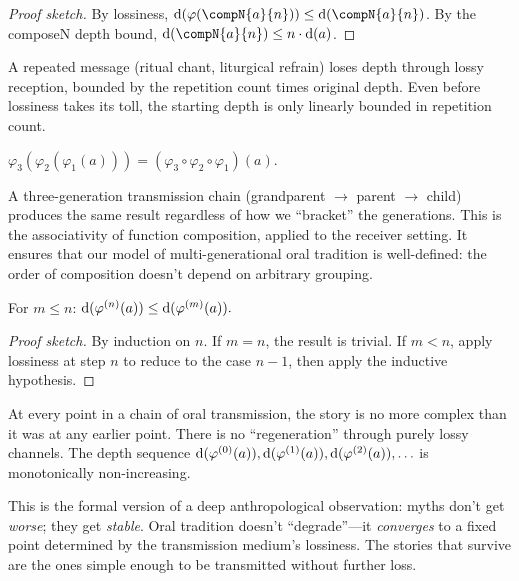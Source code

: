 \begin{proof}[Proof sketch]
By lossiness, $\depth(\varphi(\compN{a}{n}))\le\depth(\compN{a}{n})$.
By the composeN depth bound, $\depth(\compN{a}{n})\le n\cdot\depth(a)$.
\end{proof}

A repeated message (ritual chant, liturgical refrain) loses depth through
lossy reception, bounded by the repetition count times original depth.  Even
before lossiness takes its toll, the starting depth is only linearly bounded
in repetition count.

\begin{theorem}
\label{thm:receiver-assoc}
$\varphi_3(\varphi_2(\varphi_1(a)))
= (\varphi_3\circ\varphi_2\circ\varphi_1)(a).$
\end{theorem}

A three-generation transmission chain (grandparent $\to$ parent $\to$ child)
produces the same result regardless of how we ``bracket'' the generations.
This is the associativity of function composition, applied to the receiver
setting.  It ensures that our model of multi-generational oral tradition is
well-defined: the order of composition doesn't depend on arbitrary grouping.

\begin{theorem}
\label{thm:chain-depth-monotone}
For $m\le n$:
$\operatorname{d}(\varphi^{(n)}(a)) \le \operatorname{d}(\varphi^{(m)}(a)).$
\end{theorem}

\begin{proof}[Proof sketch]
By induction on $n$.  If $m=n$, the result is trivial.  If $m<n$, apply
lossiness at step $n$ to reduce to the case $n-1$, then apply the
inductive hypothesis.
\end{proof}

At every point in a chain of oral transmission, the story is no more complex
than it was at any earlier point.  There is no ``regeneration'' through
purely lossy channels.  The depth sequence $\operatorname{d}(\varphi^{(0)}(a)),
\operatorname{d}(\varphi^{(1)}(a)), \operatorname{d}(\varphi^{(2)}(a)), \ldots$ is monotonically
non-increasing.

This is the formal version of a deep anthropological observation: myths
don't get \emph{worse}; they get \emph{stable}.  Oral tradition doesn't
``degrade''---it \emph{converges} to a fixed point determined by the
transmission medium's lossiness.  The stories that survive are the ones
simple enough to be transmitted without further loss.

